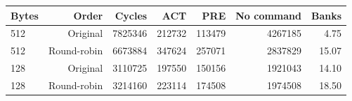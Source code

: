\begin{tabular}{lrrrrrr}
\toprule
Bytes & Order & Cycles & ACT & PRE & No command & Banks \\
\midrule
512 & Original & 7825346 & 212732 & 113479 & 4267185 & 4.75 \\
512 & Round-robin & 6673884 & 347624 & 257071 & 2837829 & 15.07 \\
128 & Original & 3110725 & 197550 & 150156 & 1921043 & 14.10 \\
128 & Round-robin & 3214160 & 223114 & 174508 & 1974508 & 18.50 \\
\bottomrule
\end{tabular}
